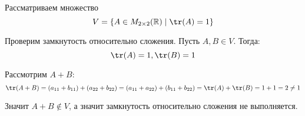 Рассматриваем множество
\[
	V = \left\{ A \in M_{2 \times 2}(\mathbb{R}) \mid \tr(A) = 1 \right\}
\]

Проверим замкнутость относительно сложения. Пусть \(A, B \in V\). Тогда:
\[
	\tr(A) = 1, \tr(B) = 1
\]

Рассмотрим \(A + B\):
\[
	\tr(A + B) = (a_{1 1} + b_{1 1}) + (a_{2 2} + b_{2 2}) = (a_{1 1} + a_{2 2}) + (b_{1 1} + b_{2 2}) = \tr(A) + \tr(B) = 1 + 1 = 2 \neq 1
\]

Значит \(A + B \notin V\), а значит замкнутость относительно сложения не выполняется.